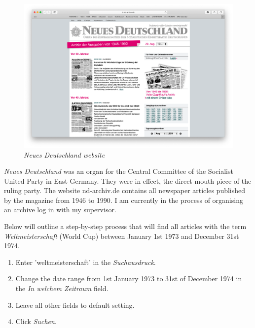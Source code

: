 \documentclass{article}
\begin{document}
\begin{figure}
    \centering
    \includegraphics[width=\textwidth]{nd.png}
    \caption{\textit{Neues Deutschland website}}
    \label{fig:my_label}
\end{figure}


\textit{Neues Deutschland} was an organ for the Central Committee of the Socialist United Party in East Germany. They were in effect, the direct mouth piece of the ruling party. The website nd-archiv.de contains all newspaper articles published by the magazine from 1946 to 1990. I am currently in the process of organising an archive log in with my supervisor.

Below will outline a step-by-step process that will find all articles with the term \textit{Weltmeisterschaft} (World Cup) between January 1st 1973 and December 31st 1974.

\begin{enumerate}
    \item Enter 'weltmeisterschaft' in the \textit{Suchausdruck}.
    \item Change the date range from 1st January 1973 to 31st of December 1974 in the \textit{In welchem Zeitraum} field.
    \item Leave all other fields to default setting.
    \item Click \textit{Suchen}.
\end{enumerate}
\end{document}
